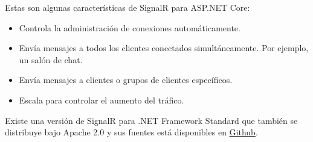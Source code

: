 Estas son algunas características de SignalR para ASP.NET Core:
\begin{itemize}
    \item Controla la administración de conexiones automáticamente.
    \item Envía mensajes a todos los clientes conectados simultáneamente. Por ejemplo, un salón de chat.
    \item Envía mensajes a clientes o grupos de clientes específicos.
    \item Escala para controlar el aumento del tráfico.
\end{itemize}

Existe una versión de SignalR para .NET Framework Standard que también se distribuye bajo Apache 2.0 y sus fuentes está disponibles en \href{https://github.com/SignalR/SignalR}{Github}.